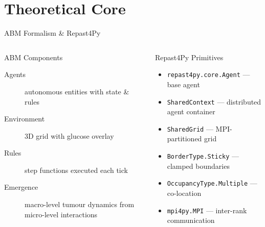 \documentclass[aspectratio=169,10pt]{beamer}
\begin{document}
\section{Theoretical Core}

\begin{frame}{ABM Formalism \& Repast4Py}
  \begin{columns}[T]
    \begin{block}{ABM Components}
      \begin{description}
        \item[Agents] autonomous entities with state \& rules
        \item[Environment] 3D grid with glucose overlay
        \item[Rules] step functions executed each tick
        \item[Emergence] macro-level tumour dynamics from micro-level interactions
      \end{description}
    \end{block}

    \begin{block}{Repast4Py Primitives}
      \begin{itemize}
        \item \texttt{repast4py.core.Agent} --- base agent
        \item \texttt{SharedContext} --- distributed agent container
        \item \texttt{SharedGrid} --- MPI-partitioned grid
        \item \texttt{BorderType.Sticky} --- clamped boundaries
        \item \texttt{OccupancyType.Multiple} --- co-location
        \item \texttt{mpi4py.MPI} --- inter-rank communication
      \end{itemize}
    \end{block}
  \end{columns}
\end{frame}
\end{document}
